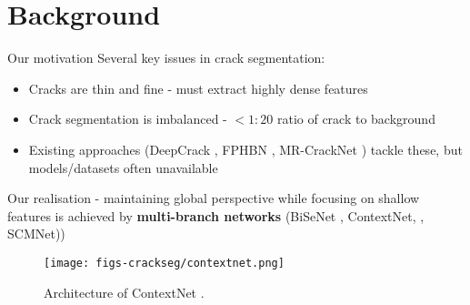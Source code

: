 \documentclass{lib/curtin_format}
\begin{document}
\section{Background}

\begin{frame}{Our motivation}
\vspace{0.1cm}
    Several key issues in crack segmentation:
    \begin{itemize}
        \item Cracks are thin and fine - must extract highly dense features
        \item Crack segmentation is imbalanced - $<1:20$ ratio of crack to background
        \item Existing approaches (DeepCrack \cite{liu2019deepcrack}, FPHBN \cite{yang2019feature}, MR-CrackNet \cite{nayyeri2021multi}) tackle these, but models/datasets often unavailable
    \end{itemize}
    Our realisation - maintaining global perspective while focusing on shallow features is achieved by \textbf{multi-branch networks} (BiSeNet \cite{yu2018bisenet}, ContextNet, \cite{poudel2018contextnet}, SCMNet)\cite{singha2021scmnet})
    \begin{figure}
        \centering
        \texttt{[image: figs-crackseg/contextnet.png]}
        \caption{Architecture of ContextNet \cite{poudel2018contextnet}.}
        \label{fig:farme2}
    \end{figure}
\end{frame}
\end{document}
